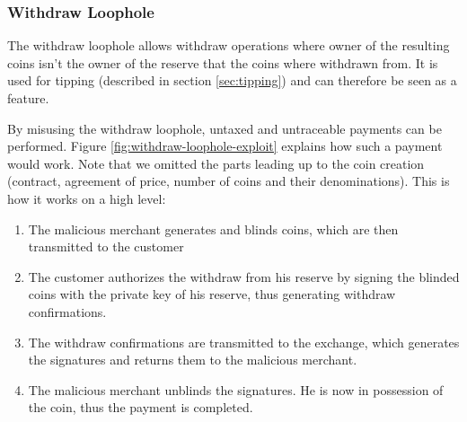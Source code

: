 \subsubsection{Withdraw Loophole}
\label{sec:withdraw-loophole}
The withdraw loophole allows withdraw operations where owner of the resulting coins isn't the owner of the reserve that the coins where withdrawn from.
It is used for tipping (described in section \ref{sec:tipping}) and can therefore be seen as a feature.

By misusing the withdraw loophole, untaxed and untraceable payments can be performed.
Figure \ref{fig:withdraw-loophole-exploit} explains how such a payment would work.
Note that we omitted the parts leading up to the coin creation (contract, agreement of price, number of coins and their denominations).
This is how it works on a high level:
\begin{enumerate}
    \item The malicious merchant generates and blinds coins, which are then transmitted to the customer
    \item The customer authorizes the withdraw from his reserve by signing the blinded coins with the private key of his reserve, thus generating withdraw confirmations.
    \item The withdraw confirmations are transmitted to the exchange, which generates the signatures and returns them to the malicious merchant.
    \item The malicious merchant unblinds the signatures.
          He is now in possession of the coin, thus the payment is completed.
\end{enumerate}

